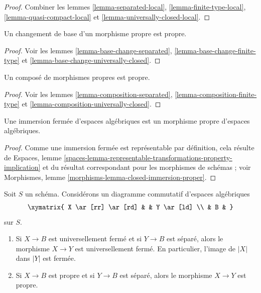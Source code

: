 \begin{proof}
Combiner les lemmes \ref{lemma-separated-local},
\ref{lemma-finite-type-local},
\ref{lemma-quasi-compact-local} et
\ref{lemma-universally-closed-local}.
\end{proof}

\begin{lemma}
\label{lemma-base-change-proper}
Un changement de base d'un morphisme propre est propre.
\end{lemma}

\begin{proof}
Voir les
lemmes \ref{lemma-base-change-separated},
\ref{lemma-base-change-finite-type} et
\ref{lemma-base-change-universally-closed}.
\end{proof}

\begin{lemma}
\label{lemma-composition-proper}
Un composé de morphismes propres est propre.
\end{lemma}

\begin{proof}
Voir les
lemmes \ref{lemma-composition-separated},
\ref{lemma-composition-finite-type} et
\ref{lemma-composition-universally-closed}.
\end{proof}

\begin{lemma}
\label{lemma-closed-immersion-proper}
Une immersion fermée d'espaces algébriques est un morphisme propre
d'espaces algébriques.
\end{lemma}

\begin{proof}
Comme une immersion fermée est représentable par définition, cela résulte de
Espaces,
lemme \ref{spaces-lemma-representable-transformations-property-implication}
et du résultat correspondant pour les morphismes de schémas ; voir
Morphismes, lemme \ref{morphisms-lemma-closed-immersion-proper}.
\end{proof}

\begin{lemma}
\label{lemma-universally-closed-permanence}
Soit $S$ un schéma.
Considérons un diagramme commutatif d'espaces algébriques
$$
\xymatrix{
X \ar[rr] \ar[rd] & &
Y \ar[ld] \\
& B &
}
$$
sur $S$.
\begin{enumerate}
\item Si $X \to B$ est universellement fermé et si $Y \to B$ est
séparé, alors le morphisme $X \to Y$ est universellement fermé.
En particulier, l'image de $|X|$ dans $|Y|$ est fermée.
\item Si $X \to B$ est propre et si $Y \to B$ est séparé, alors
le morphisme $X \to Y$ est propre.
\end{enumerate}
\end{lemma}

